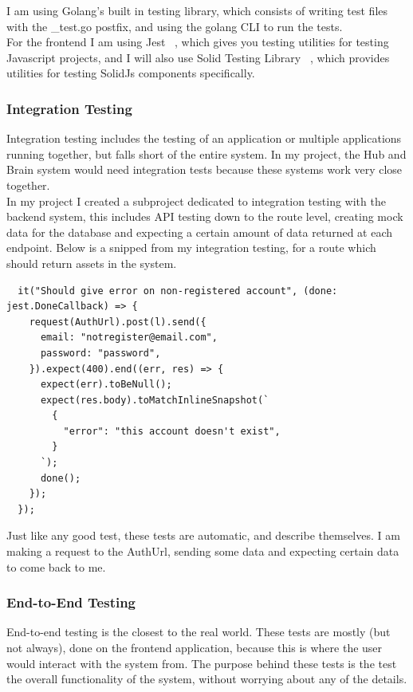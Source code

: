 \documentclass[titlepage]{article}
\begin{document}
I am using Golang's built in testing library, which consists of writing test files with the \_test.go postfix, and using the golang CLI to run the tests. \\

For the frontend I am using Jest ~\cite{jest}, which gives you testing utilities for testing Javascript projects, and I will also use Solid Testing Library ~\cite{solid_testing}, which provides utilities for testing SolidJs components specifically.

\subsubsection{Integration Testing}
Integration testing includes the testing of an application or multiple applications running together, but falls short of the entire system. In my project, the Hub and Brain system would need integration tests because these systems work very close together. \\

In my project I created a subproject dedicated to integration testing with the backend system, this includes API testing down to the route level, creating mock data for the database and expecting a certain amount of data returned at each endpoint. Below is a snipped from my integration testing, for a route which should return assets in the system.

\begin{verbatim}
  it("Should give error on non-registered account", (done: jest.DoneCallback) => {
    request(AuthUrl).post(l).send({
      email: "notregister@email.com",
      password: "password",
    }).expect(400).end((err, res) => {
      expect(err).toBeNull();
      expect(res.body).toMatchInlineSnapshot(`
        {
          "error": "this account doesn't exist",
        }
      `);
      done();
    });
  });
\end{verbatim}

Just like any good test, these tests are automatic, and describe themselves. I am making a request to the AuthUrl, sending some data and expecting certain data to come back to me. \\

\subsubsection{End-to-End Testing}
End-to-end testing is the closest to the real world. These tests are mostly (but not always), done on the frontend application, because this is where the user would interact with the system from. The purpose behind these tests is the test the overall functionality of the system, without worrying about any of the details. \\
\end{document}
